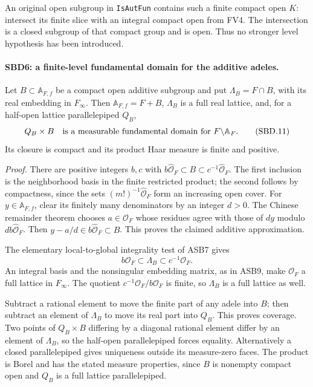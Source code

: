 \documentclass[11pt,a4paper]{article}
\numberwithin{equation}{section}
\theoremstyle{remark}\newtheorem{remark}[theorem]{Remark}
\begin{document}
An original open subgroup in \texttt{Is\allowbreak Aut\allowbreak Fun} contains such a
finite compact open \(K\): intersect its finite slice with an
integral compact open from FV4.  The intersection is a closed
subgroup of that compact group and is open.  Thus no stronger
level hypothesis has been introduced.

\paragraph{SBD6: a finite-level fundamental domain for the additive adeles.}
\label{claim:SBD6}
Let \(B\subset\mathbb A_{F,f}\) be a compact open additive
subgroup and put \(\Lambda_B=F\cap B\), with its real embedding
in \(F_\infty\).  Then
\(\mathbb A_{F,f}=F+B\), \(\Lambda_B\) is a full real lattice,
and, for a half-open lattice parallelepiped \(Q_B\),
\[
             Q_B\times B
 \quad\hbox{is a measurable fundamental domain for }
             F\backslash\mathbb A_F.
 \tag{SBD.11}
\]
Its closure is compact and its product Haar measure is finite
and positive.

\emph{Proof.}
There are positive integers \(b,c\) with
\(b\widehat{\mathcal O}_F\subset B\subset
c^{-1}\widehat{\mathcal O}_F\).  The first inclusion is the
neighborhood basis in the finite restricted product; the second
follows by compactness, since the sets
\((m!)^{-1}\widehat{\mathcal O}_F\) form an increasing open
cover.  For \(y\in\mathbb A_{F,f}\), clear its finitely many
denominators by an integer \(d>0\).  The Chinese remainder
theorem chooses \(a\in\mathcal O_F\) whose residues agree with
those of \(dy\) modulo \(db\widehat{\mathcal O}_F\).
Then \(y-a/d\in b\widehat{\mathcal O}_F\subset B\).
This proves the claimed additive approximation.

The elementary local-to-global integrality test of ASB7 gives
\[
 b\mathcal O_F\subset\Lambda_B\subset c^{-1}\mathcal O_F.
\]
An integral basis and the nonsingular embedding matrix, as in
ASB9, make \(\mathcal O_F\) a full lattice in \(F_\infty\).
The quotient \(c^{-1}\mathcal O_F/b\mathcal O_F\) is finite,
so \(\Lambda_B\) is a full lattice as well.

Subtract a rational element to move the finite part of any
adele into \(B\); then subtract an element of \(\Lambda_B\)
to move its real part into \(Q_B\).  This proves coverage.
Two points of \(Q_B\times B\) differing by a diagonal rational
element differ by an element of \(\Lambda_B\), so the half-open
parallelepiped forces equality.  Alternatively a closed
parallelepiped gives uniqueness outside its measure-zero faces.
The product is Borel and has the stated measure properties,
since \(B\) is nonempty compact open and \(Q_B\) is a full
lattice parallelepiped.
\end{document}
